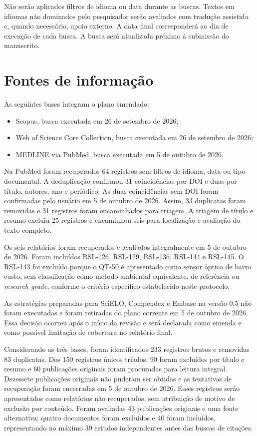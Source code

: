 \documentclass[11pt,a4paper]{article}
\begin{document}
Não serão aplicados filtros de idioma ou data durante as buscas. Textos em idiomas
não dominados pelo pesquisador serão avaliados com tradução assistida e, quando necessário,
apoio externo. A data final corresponderá ao dia de execução de cada busca. A busca
será atualizada próximo à submissão do manuscrito.

\section{Fontes de informação}

As seguintes bases integram o plano emendado:

\begin{itemize}
  \item Scopus, busca executada em 26 de setembro de 2026;
  \item Web of Science Core Collection, busca executada em 26 de setembro de 2026;
  \item MEDLINE via PubMed, busca executada em 5 de outubro de 2026.
\end{itemize}

Na PubMed foram recuperados 64 registros sem filtros de idioma, data ou tipo
documental. A deduplicação confirmou 31 coincidências por DOI e duas por título,
autores, ano e periódico. As duas coincidências sem DOI foram confirmadas pelo usuário
em 5 de outubro de 2026. Assim, 33 duplicatas foram removidas e 31 registros foram
encaminhados para triagem. A triagem de título e resumo excluiu 25 registros e
encaminhou seis para localização e avaliação do texto completo.

Os seis relatórios foram recuperados e avaliados integralmente em 5 de outubro de
2026. Foram incluídos RSL-126, RSL-129, RSL-136, RSL-144 e RSL-145. O RSL-143 foi
excluído porque o QT-50 é apresentado como sensor óptico de baixo custo, sem
classificação como método ambiental equivalente, de referência ou
\emph{research grade}, conforme o critério específico estabelecido neste protocolo.

As estratégias preparadas para SciELO, Compendex e Embase na versão 0.5 não foram
executadas e foram retiradas do plano corrente em 5 de outubro de 2026. Essa decisão
ocorreu após o início da revisão e será declarada como emenda e como possível limitação
de cobertura no relatório final.

Considerando as três bases, foram identificados 233 registros brutos e removidas 83
duplicatas. Dos 150 registros únicos triados, 90 foram excluídos por título e resumo e
60 publicações originais foram procuradas para leitura integral. Dezessete publicações
originais não puderam ser obtidas e as tentativas de recuperação foram encerradas em
5 de outubro de 2026. Esses registros serão apresentados como relatórios não
recuperados, sem atribuição de motivo de exclusão por conteúdo. Foram avaliadas 43
publicações originais e uma fonte alternativa; quatro documentos foram excluídos e 40
foram incluídos, representando no máximo 39 estudos independentes antes das buscas de
citações.
\end{document}
